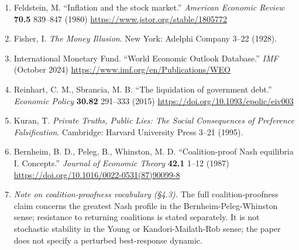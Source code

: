 \documentclass[12pt]{article}
\theoremstyle{definition}
\theoremstyle{remark}
\begin{document}
\begin{enumerate}[leftmargin=*,labelsep=0.5em,label=\arabic*.]
\item Feldstein, M. ``Inflation and the stock market.''
\emph{American Economic Review} \textbf{70.5} 839--847 (1980)
\url{https://www.jstor.org/stable/1805772}

\item Fisher, I. \emph{The Money Illusion}. New York: Adelphi
Company 3--22 (1928).

\item International Monetary Fund. ``World Economic Outlook
Database.'' \emph{IMF} (October 2024)
\url{https://www.imf.org/en/Publications/WEO}

\item Reinhart, C. M., Sbrancia, M. B. ``The liquidation of
government debt.'' \emph{Economic Policy} \textbf{30.82}
291--333 (2015) \url{https://doi.org/10.1093/epolic/eiv003}

\item Kuran, T. \emph{Private Truths, Public Lies: The Social
Consequences of Preference Falsification}. Cambridge: Harvard
University Press 3--21 (1995).

\item Bernheim, B. D., Peleg, B., Whinston, M. D.
``Coalition-proof Nash equilibria I. Concepts.'' \emph{Journal of
Economic Theory} \textbf{42.1} 1--12 (1987)
\url{https://doi.org/10.1016/0022-0531(87)90099-8}

\item \emph{Note on coalition-proofness vocabulary (\S4.3).} The full coalition-proofness claim concerns the greatest Nash profile in the Bernheim-Peleg-Whinston sense; resistance to returning coalitions is stated separately. It is not stochastic stability in the Young or Kandori-Mailath-Rob sense; the paper does not specify a perturbed best-response dynamic.

\end{enumerate}
\end{document}
